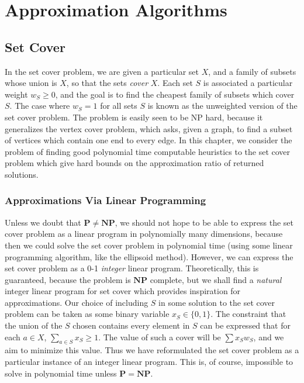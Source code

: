 \part{Approximation Algorithms}

\chapter{Set Cover}

In the set cover problem, we are given a particular set $X$, and a family of subsets whose union is $X$, so that the sets {\it cover} $X$. Each set $S$ is associated a particular weight $w_S \geq 0$, and the goal is to find the cheapest family of subsets which cover $S$. The case where $w_S = 1$ for all sets $S$ is known as the unweighted version of the set cover problem. The problem is easily seen to be NP hard, because it generalizes the vertex cover problem, which asks, given a graph, to find a subset of vertices which contain one end to every edge. In this chapter, we consider the problem of finding good polynomial time computable heuristics to the set cover problem which give hard bounds on the approximation ratio of returned solutions.

\section{Approximations Via Linear Programming}

Unless we doubt that $\mathbf{P} \neq \mathbf{NP}$, we should not hope to be able to express the set cover problem as a linear program in polynomially many dimensions, because then we could solve the set cover problem in polynomial time (using some linear programming algorithm, like the ellipsoid method). However, we can express the set cover problem as a 0-1 {\it integer} linear program. Theoretically, this is guaranteed, because the problem is $\mathbf{NP}$ complete, but we shall find a {\it natural} integer linear program for set cover which provides inspiration for approximations. Our choice of including $S$ in some solution to the set cover problem can be taken as some binary variable $x_S \in \{ 0, 1 \}$. The constraint that the union of the $S$ chosen contains every element in $S$ can be expressed that for each $a \in X$, $\sum_{a \in S} x_S \geq 1$. The value of such a cover will be $\sum x_S w_S$, and we aim to minimize this value. Thus we have reformulated the set cover problem as a particular instance of an integer linear program. This is, of course, impossible to solve in polynomial time unless $\mathbf{P} = \mathbf{NP}$.

